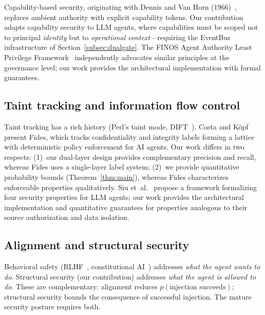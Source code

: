 \documentclass[pdflatex,sn-nature]{sn-jnl}%
\theoremstyle{thmstyleone}%
\theoremstyle{thmstyletwo}%
\theoremstyle{thmstylethree}%
\begin{document}
Capability-based security, originating with Dennis and Van Horn (1966)~\cite{dennis1966programming}, replaces ambient authority with explicit capability tokens. Our contribution adapts capability security to LLM agents, where capabilities must be scoped not to principal \emph{identity} but to \emph{operational context}---requiring the EventBus infrastructure of Section~\ref{subsec:dualgate}. The FINOS Agent Authority Least Privilege Framework~\cite{finos2026aigf} independently advocates similar principles at the governance level; our work provides the architectural implementation with formal guarantees.

\subsection{Taint tracking and information flow control}\label{subsec:ifc}

Taint tracking has a rich history (Perl's taint mode, DIFT~\cite{suh2004dift}). Costa and K\"opf~\cite{costa2025fides} present Fides, which tracks confidentiality and integrity labels forming a lattice with deterministic policy enforcement for AI agents. Our work differs in two respects: (1)~our dual-layer design provides complementary precision and recall, whereas Fides uses a single-layer label system; (2)~we provide quantitative probability bounds (Theorem~\ref{thm:main}), whereas Fides characterizes enforceable properties qualitatively. Siu et~al.~\cite{siu2025framework} propose a framework formalizing four security properties for LLM agents; our work provides the architectural implementation and quantitative guarantees for properties analogous to their source authorization and data isolation.

\subsection{Alignment and structural security}\label{subsec:alignment}

Behavioral safety (RLHF~\cite{ouyang2022training}, constitutional AI~\cite{bai2022constitutional}) addresses \emph{what the agent wants to do}. Structural security (our contribution) addresses \emph{what the agent is allowed to do}. These are complementary: alignment reduces $p(\text{injection succeeds})$; structural security bounds the consequence of successful injection. The mature security posture requires both.

\end{document}
